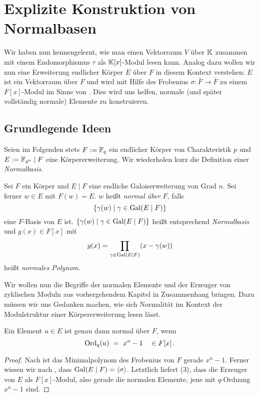 \chapter{Explizite Konstruktion von Normalbasen}

Wir haben nun kennengelernt, wie man einen 
Vektorraum $V$ über $\mathbb{K}$ zusammen mit einem Endomorphismus $\tau$ als
$\mathbb{K}[x]$-Modul lesen kann. Analog dazu wollen wir nun eine Erweiterung
endlicher Körper $E$ über $F$ in diesem Kontext verstehen: $E$ ist ein
Vektorraum über $F$ und wird mit Hilfe des Frobenius 
$\sigma: \bar F \to \bar F$ zu einem $F[x]$-Modul im Sinne von 
. Dies wird uns helfen, normale (und später vollständig
normale) Elemente zu konstruieren.

\section{Grundlegende Ideen}

Seien im Folgenden stets $F := \mathbb{F}_q$ ein endlicher Körper von 
Charakteristik $p$ und $E := \mathbb{F}_{q^n} \mid F$ eine Körpererweiterung.
Wir wiederholen kurz die Definition einer \emph{Normalbasis}.

\begin{definition}
  Sei $F$ ein Körper und $E \mid F$ eine endliche Galoiserweiterung von Grad
  $n$. Sei ferner $w\in E$ mit $F(w) = E$. $w$ heißt \emph{normal über $F$},
  falls
  \[ \{ \gamma(w) \mid \gamma \in \operatorname{Gal}(E\mid F) \}\]
  eine $F$-Basis von $E$ ist. 
  $\{ \gamma(w) \mid \gamma \in \operatorname{Gal}(E\mid F)\}$ heißt entsprechend 
  \emph{Normalbasis} und $g(x) \in F[x]$ mit 
  \[ g(x) = \prod_{\gamma \in \operatorname{Gal}(E\mid F)}(x - \gamma(w))\]
  heißt \emph{normales Polynom}.
\end{definition}

Wir wollen nun die Begriffe der normalen Elemente und der Erzeuger von
zyklischen Moduln aus vorhergehendem Kapitel in Zusammenhang bringen. Dazu
müssen wir uns Gedanken machen, wie sich Normalität im Kontext der
Modulstruktur einer Körpererweiterung lesen lässt.

\begin{satz}
  Ein Element $u\in E$ ist genau dann normal über $F$, wenn
  \[ \operatorname{Ord}_q(u) \ =\  x^n-1 \quad\in F[x]\,.\]
\end{satz}
\begin{proof}
  Nach  ist das Minimalpolynom des Frobenius von $F$
  gerade $x^n-1$. Ferner wissen wir nach ,
  dass $\operatorname{Gal}(E\mid F) = \langle\sigma\rangle$. 
  Letztlich liefert  (3), dass die Erzeuger von 
  $E$ als $F[x]$-Modul, also gerade die normalen Elemente, jene mit $q$-Ordnung
  $x^n-1$ sind.
\end{proof}

